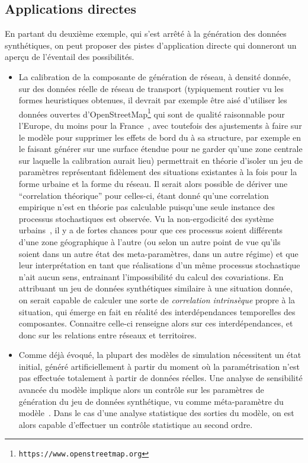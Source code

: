 \subsection*{Applications directes}


En partant du deuxième exemple, qui s'est arrêté à la génération des données synthétiques, on peut proposer des pistes d'application directe qui donneront un aperçu de l'éventail des possibilités.

\begin{itemize}
\item La calibration de la composante de génération de réseau, à densité donnée, sur des données réelle de réseau de transport (typiquement routier vu les formes heuristiques obtenues, il devrait par exemple être aisé d'utiliser les données ouvertes d'OpenStreetMap\footnote{\texttt{https://www.openstreetmap.org}} qui sont de qualité raisonnable pour l'Europe, du moins pour la France~\cite{girres2010quality}, avec toutefois des ajustements à faire sur le modèle pour supprimer les effets de bord du à sa structure, par exemple en le faisant générer sur une surface étendue pour ne garder qu'une zone centrale sur laquelle la calibration aurait lieu) permettrait en théorie d'isoler un jeu de paramètres représentant fidèlement des situations existantes à la fois pour la forme urbaine et la forme du réseau. Il serait alors possible de dériver une ``correlation théorique'' pour celles-ci, étant donné qu'une correlation empirique n'est en théorie pas calculable puisqu'une seule instance des processus stochastiques est observée. Vu la non-ergodicité des système urbains~\cite{pumain2012urban}, il y a de fortes chances pour que ces processus soient différents d'une zone géographique à l'autre (ou selon un autre point de vue qu'ils soient dans un autre état des meta-paramètres, dans un autre régime) et que leur interprétation en tant que réalisations d'un même processus stochastique n'ait aucun sens, entrainant l'impossibilité du calcul des covariations. En attribuant un jeu de données synthétiques similaire à une situation donnée, on serait capable de calculer une sorte de \emph{correlation intrinsèque} propre à la situation, qui émerge en fait en réalité des interdépendances temporelles des composantes. Connaitre celle-ci renseigne alors sur ces interdépendances, et donc sur les relations entre réseaux et territoires.
\item Comme déjà évoqué, la plupart des modèles de simulation nécessitent un état initial, généré artificiellement à partir du moment où la paramétrisation n'est pas effectuée totalement à partir de données réelles. Une analyse de sensibilité avancée du modèle implique alors un contrôle sur les paramètres de génération du jeu de données synthétique, vu comme méta-paramètre du modèle~\cite{cottineau2015revisiting}. Dans le cas d'une analyse statistique des sorties du modèle, on est alors capable d'effectuer un contrôle statistique au second ordre.

\end{itemize}
